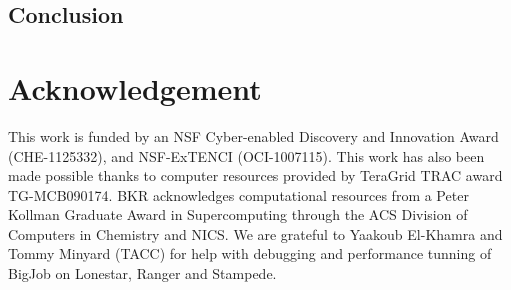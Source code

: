 \documentclass{sig-alternate}
\newcommand{\jhanote}[1]{ {\textcolor{red} { ***SJ: #1 }}}
\newcommand{\jhanote}[1]{}
\begin{document}







\subsection{Conclusion}

\section*{Acknowledgement} {\footnotesize This work is funded by an
  NSF Cyber-enabled Discovery and Innovation Award (CHE-1125332), and
  NSF-ExTENCI (OCI-1007115). This work has also been made possible
  thanks to computer resources provided by TeraGrid TRAC award
  TG-MCB090174.  BKR acknowledges computational resources from a 
  Peter Kollman Graduate Award in Supercomputing through the ACS Division of 
  Computers in Chemistry and NICS. We are grateful to Yaakoub
  El-Khamra and Tommy Minyard (TACC) for help with debugging and
  performance tunning of BigJob on Lonestar, Ranger and Stampede.}


%
%

\end{document}
